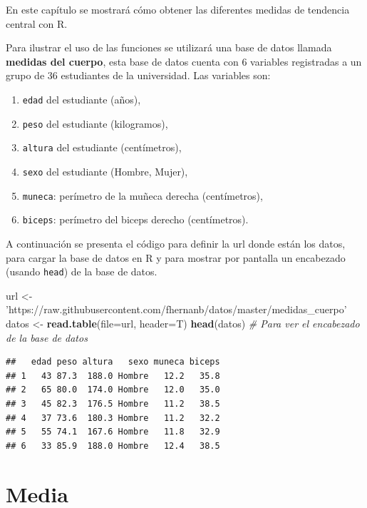 \documentclass[10pt,]{krantz}
\makeatletter
\newenvironment{Shaded}{\begin{snugshade}}{\end{snugshade}}
\newcommand{\KeywordTok}[1]{\textcolor[rgb]{0.13,0.29,0.53}{\textbf{{#1}}}}
\newcommand{\DataTypeTok}[1]{\textcolor[rgb]{0.13,0.29,0.53}{{#1}}}
\newcommand{\StringTok}[1]{\textcolor[rgb]{0.31,0.60,0.02}{{#1}}}
\newcommand{\CommentTok}[1]{\textcolor[rgb]{0.56,0.35,0.01}{\textit{{#1}}}}
\newcommand{\NormalTok}[1]{{#1}}
\providecommand{\tightlist}{%
  \setlength{\itemsep}{0pt}\setlength{\parskip}{0pt}}
\let\proglang=\textsf
\newenvironment{kframe}{%
\medskip{}
\setlength{\fboxsep}{.8em}
 \def\at@end@of@kframe{}%
 \ifinner\ifhmode%
  \def\at@end@of@kframe{\end{minipage}}%
  \begin{minipage}{\columnwidth}%
 \fi\fi%
 \def\FrameCommand##1{\hskip\@totalleftmargin \hskip-\fboxsep
 \colorbox{shadecolor}{##1}\hskip-\fboxsep
     \hskip-\linewidth \hskip-\@totalleftmargin \hskip\columnwidth}%
 \MakeFramed {\advance\hsize-\width
   \@totalleftmargin\z@ \linewidth\hsize
   \@setminipage}}%
 {\par\unskip\endMakeFramed%
 \at@end@of@kframe}
\renewenvironment{Shaded}{\begin{kframe}}{\end{kframe}}
\makeatother
\begin{document}
En este capítulo se mostrará cómo obtener las diferentes medidas de
tendencia central con \proglang{R}.

Para ilustrar el uso de las funciones se utilizará una base de datos
llamada \textbf{medidas del cuerpo}, esta base de datos cuenta con 6
variables registradas a un grupo de 36 estudiantes de la universidad.
Las variables son:

\begin{enumerate}
\def\labelenumi{\arabic{enumi}.}
\tightlist
\item
  \texttt{edad} del estudiante (años),
\item
  \texttt{peso} del estudiante (kilogramos),
\item
  \texttt{altura} del estudiante (centímetros),
\item
  \texttt{sexo} del estudiante (Hombre, Mujer),
\item
  \texttt{muneca}: perímetro de la muñeca derecha (centímetros),
\item
  \texttt{biceps}: perímetro del biceps derecho (centímetros).
\end{enumerate}

A continuación se presenta el código para definir la url donde están los
datos, para cargar la base de datos en R y para mostrar por pantalla un
encabezado (usando \texttt{head}) de la base de datos.

\begin{Shaded}
\begin{Highlighting}[]
\NormalTok{url <-}\StringTok{ 'https://raw.githubusercontent.com/fhernanb/datos/master/medidas_cuerpo'}
\NormalTok{datos <-}\StringTok{ }\KeywordTok{read.table}\NormalTok{(}\DataTypeTok{file=}\NormalTok{url, }\DataTypeTok{header=}\NormalTok{T)}
\KeywordTok{head}\NormalTok{(datos)  }\CommentTok{# Para ver el encabezado de la base de datos}
\end{Highlighting}
\end{Shaded}

\begin{verbatim}
##   edad peso altura   sexo muneca biceps
## 1   43 87.3  188.0 Hombre   12.2   35.8
## 2   65 80.0  174.0 Hombre   12.0   35.0
## 3   45 82.3  176.5 Hombre   11.2   38.5
## 4   37 73.6  180.3 Hombre   11.2   32.2
## 5   55 74.1  167.6 Hombre   11.8   32.9
## 6   33 85.9  188.0 Hombre   12.4   38.5
\end{verbatim}

\section{\texorpdfstring{Media 
}{Media  }}\label{media}
\end{document}
